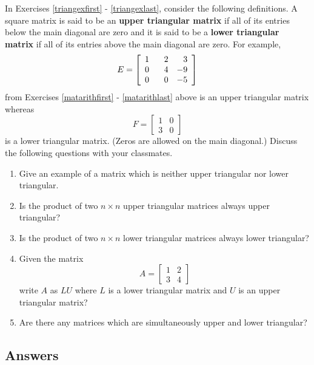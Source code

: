 \label{triangularmatrices}

In Exercises \ref{triangexfirst} - \ref{triangexlast}, consider the following definitions. A square matrix is said to be an   {\bf upper triangular matrix} if all of its entries below the main diagonal are zero and it is said to be a {\bf lower triangular matrix}   if all of its entries above the main diagonal are zero. For example, \[E = \left[ \begin{array}{rrr} 1 & \hphantom{-}2 & 3 \\ 0 & 4 & -9 \\ 0 & 0 & -5 \end{array} \right]\] from Exercises \ref{matarithfirst} - \ref{matarithlast} above is an upper triangular matrix whereas \[F = \left[ \begin{array}{rr} 1 & 0 \\ 3 & 0 \end{array} \right]\] is a lower triangular matrix.  (Zeros are allowed on the main diagonal.)  Discuss the following questions with your classmates.

\begin{enumerate}
\setcounter{enumi}{\value{HW}}

\item Give an example of a matrix which is neither upper triangular nor lower triangular. \label{triangexfirst} 
\item Is the product of two $n \times n$ upper triangular matrices always upper triangular?
\item Is the product of two $n \times n$ lower triangular matrices always lower triangular?
\item Given the matrix \[A = \left[ \begin{array}{rr} 1 & 2 \\ 3 & 4 \end{array} \right]\] write $A$ as $LU$ where $L$ is a lower triangular matrix and $U$ is an upper triangular matrix?
\item Are there any matrices which are simultaneously upper and lower triangular? \label{triangexlast}

\setcounter{HW}{\value{enumi}}
\end{enumerate}


\newpage

\subsection{Answers}


